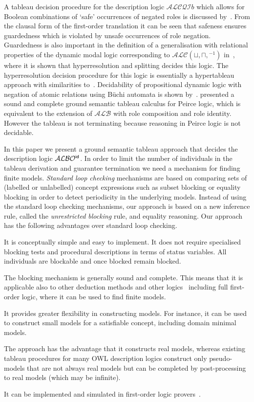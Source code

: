 \documentclass[leqno
,pdflatex
,prodmode
,acmtocl
]{acmsmall}
\newcommand{\mathcmd}[1]{\ensuremath{#1}\xspace}
\newcommand{\dlfont}{\mathcal}
\newcommand{\dl}[1]{\mathcmd{\dlfont{#1}}}
\newcommand{\idRole}{\mathcmd{\textsf{\upshape\mdseries id}}}
\newcommand{\ALBOid}{\dl{ALBO\smash[t]{\mbox{${}^{\idRole}$}}}}
\newcommand{\ALC}{\dl{ALC}}
\def\And{\sqcap}
\newcommand{\ALB}{\dl{ALB}}
\def\Or{\sqcup}
\newcommand{\ALCQIb}{$\dlfont{ALCQI}b$\xspace}
\begin{document}
A tableau decision procedure for the description logic \ALCQIb which
allows for Boolean combinations of `safe' occurrences of negated
roles is discussed by~.
From the clausal form of the first-order translation it can be seen that
safeness ensures guardedness which is
violated by unsafe occurrences of role negation.
Guardedness is also important in the definition of a generalisation 
with relational properties of the dynamic modal logic corresponding to
$\ALC(\Or,\And,{}^{-1})$ in~, where it
is shown that hyperresolution and splitting decides this logic.
The hyperresolution decision procedure for this logic is essentially a
hypertableau approach with similarities to~.
Decidability of propositional dynamic logic with negation of atomic
relations using B\"uchi automata is shown by~.
 presented a sound and complete ground
semantic tableau calculus for Peirce logic, which is equivalent to the extension of \ALB with role composition and
role identity.
However the tableau is not terminating because reasoning in Peirce
logic is not decidable.

In this paper we present a ground semantic tableau approach that
decides the description logic \ALBOid.
In order to limit the number of individuals in the tableau derivation and guarantee
termination we need a
mechanism for finding finite models.
\emph{Standard loop checking} mechanisms are based on
comparing sets of (labelled or unlabelled)
concept expressions such as subset blocking or equality blocking
in order to detect periodicity in the underlying models.
Instead of using the standard loop checking mechanisms,
our approach is based on a new inference rule, called the \emph{unrestricted
blocking} rule, and equality reasoning. 
Our approach has the following advantages over standard loop checking.
\begin{longitem}
 \item It is conceptually simple and easy to implement.
 It does not require specialised blocking tests and 
procedural descriptions in terms of status variables.
All individuals are blockable and once blocked remain blocked.
 \item The blocking mechanism is generally sound and complete. 
    This means that it is applicable also to other deduction
    methods and other
    logics~\cite{SchmidtTishkovsky-GTM+-2008}
    including full first-order logic, where it can be used
    to find finite models. 
 \item It provides greater flexibility in constructing models.
       For instance, it can be used to construct small models for a satisfiable concept,
       including domain minimal models.
 \item
The approach has the advantage that it constructs
real models, whereas existing tableau procedures for many OWL 
description logics construct only pseudo-models that are not always
real models but can be completed by post-processing to real
models (which may be infinite).
\item
It can be implemented and simulated in first-order logic
provers~\cite{BaumgartnerSchmidt08}.
\end{longitem}
\end{document}
